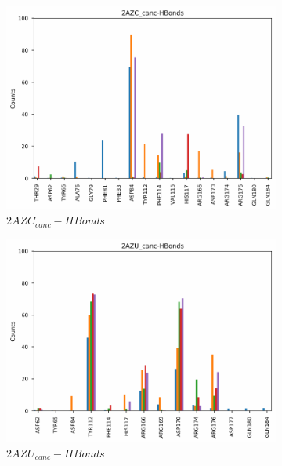 \documentclass[fleqn,10pt]{wlscirep}
\begin{document}
\begin{figure}[!ht]
\centering
   \begin{subfigure}{.45\textwidth}
     \centering
     \includegraphics[width=.95\linewidth]{2AZC_canc/2AZC_canc-HBonds.pdf}
     \caption{$2AZC_{canc}-HBonds$}
     \label{fig:2AZC_canc-HBonds}
   \end{subfigure}
   \begin{subfigure}{.45\textwidth}
     \centering
     \includegraphics[width=.95\linewidth]{2AZU_canc/2AZU_canc-HBonds.pdf}
     \caption{$2AZU_{canc}-HBonds$}
     \label{fig:2AZU_canc-HBonds}
   \end{subfigure}
   \\
   \begin{subfigure}{.45\textwidth}
     \centering

\end{subfigure}
\end{figure}
\end{document}
